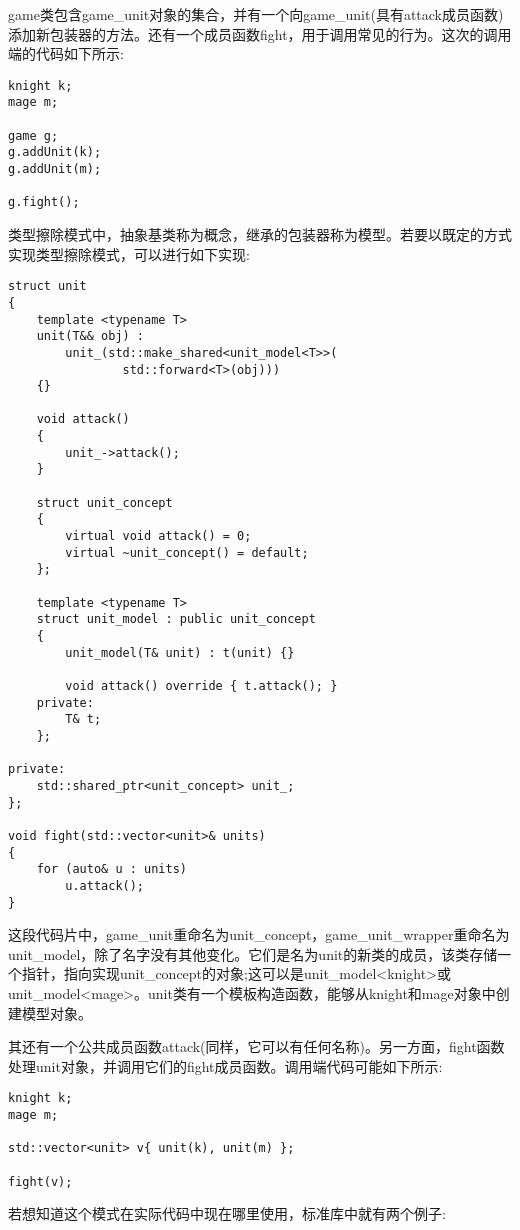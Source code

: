 game类包含game\_unit对象的集合，并有一个向game\_unit(具有attack成员函数)添加新包装器的方法。还有一个成员函数fight，用于调用常见的行为。这次的调用端的代码如下所示:

\begin{lstlisting}[style=styleCXX]
knight k;
mage m;

game g;
g.addUnit(k);
g.addUnit(m);

g.fight();
\end{lstlisting}

类型擦除模式中，抽象基类称为概念，继承的包装器称为模型。若要以既定的方式实现类型擦除模式，可以进行如下实现:

\begin{lstlisting}[style=styleCXX]
struct unit
{
	template <typename T>
	unit(T&& obj) :
		unit_(std::make_shared<unit_model<T>>(
				std::forward<T>(obj)))
	{}
	
	void attack()
	{
		unit_->attack();
	}

	struct unit_concept
	{
		virtual void attack() = 0;
		virtual ~unit_concept() = default;
	};

	template <typename T>
	struct unit_model : public unit_concept
	{
		unit_model(T& unit) : t(unit) {}
		
		void attack() override { t.attack(); }
	private:
		T& t;
	};

private:
	std::shared_ptr<unit_concept> unit_;
};

void fight(std::vector<unit>& units)
{
	for (auto& u : units)
		u.attack();
}
\end{lstlisting}

这段代码片中，game\_unit重命名为unit\_concept，game\_unit\_wrapper重命名为unit\_model，除了名字没有其他变化。它们是名为unit的新类的成员，该类存储一个指针，指向实现unit\_concept的对象;这可以是unit\_model<knight>或unit\_model<mage>。unit类有一个模板构造函数，能够从knight和mage对象中创建模型对象。

其还有一个公共成员函数attack(同样，它可以有任何名称)。另一方面，fight函数处理unit对象，并调用它们的fight成员函数。调用端代码可能如下所示:

\begin{lstlisting}[style=styleCXX]
knight k;
mage m;

std::vector<unit> v{ unit(k), unit(m) };

fight(v);
\end{lstlisting}

若想知道这个模式在实际代码中现在哪里使用，标准库中就有两个例子:

